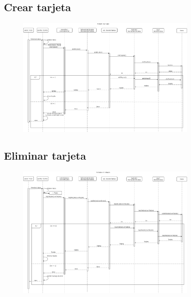 \documentclass[12pt]{article}
\begin{document}
\subsection{Crear tarjeta}
\begin{figure}[H]
    \centering
    \includegraphics[width=0.8\textwidth]{images/14-Gestor_crea_tarjeta.png}
\end{figure}
\subsection{Eliminar tarjeta}
\begin{figure}[H]
    \centering
    \includegraphics[width=0.8\textwidth]{images/15-Gestor_elimina_tarjeta.png}
\end{figure}
\end{document}
